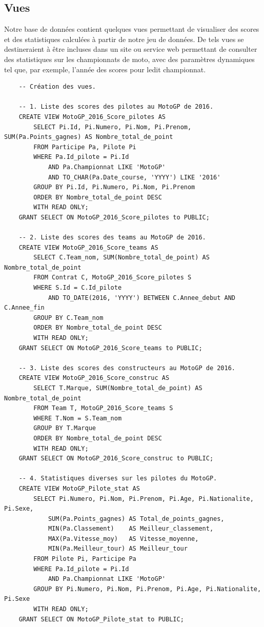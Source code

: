 \documentclass[12pt,a4paper]{article}
\newenvironment{code}{\captionsetup{type=listing}}{}
\begin{document}
\subsection{Vues}
\label{sub.views}

Notre base de données contient quelques vues permettant de visualiser des scores
et des statistiques calculées à partir de notre jeu de données. De tels vues se
destineraient à être incluses dans un site ou service web permettant de consulter
des statistiques sur les championnats de moto, avec des paramètres dynamiques
tel que, par exemple, l'année des scores pour ledit championnat.

\begin{code}
    \begin{verbatim}
    -- Création des vues.

    -- 1. Liste des scores des pilotes au MotoGP de 2016.
    CREATE VIEW MotoGP_2016_Score_pilotes AS
        SELECT Pi.Id, Pi.Numero, Pi.Nom, Pi.Prenom, SUM(Pa.Points_gagnes) AS Nombre_total_de_point
        FROM Participe Pa, Pilote Pi
        WHERE Pa.Id_pilote = Pi.Id
            AND Pa.Championnat LIKE 'MotoGP'
            AND TO_CHAR(Pa.Date_course, 'YYYY') LIKE '2016'
        GROUP BY Pi.Id, Pi.Numero, Pi.Nom, Pi.Prenom
        ORDER BY Nombre_total_de_point DESC
        WITH READ ONLY;
    GRANT SELECT ON MotoGP_2016_Score_pilotes to PUBLIC;
        
    -- 2. Liste des scores des teams au MotoGP de 2016.
    CREATE VIEW MotoGP_2016_Score_teams AS
        SELECT C.Team_nom, SUM(Nombre_total_de_point) AS Nombre_total_de_point
        FROM Contrat C, MotoGP_2016_Score_pilotes S
        WHERE S.Id = C.Id_pilote
            AND TO_DATE(2016, 'YYYY') BETWEEN C.Annee_debut AND C.Annee_fin
        GROUP BY C.Team_nom
        ORDER BY Nombre_total_de_point DESC
        WITH READ ONLY;
    GRANT SELECT ON MotoGP_2016_Score_teams to PUBLIC;

    -- 3. Liste des scores des constructeurs au MotoGP de 2016.
    CREATE VIEW MotoGP_2016_Score_construc AS
        SELECT T.Marque, SUM(Nombre_total_de_point) AS Nombre_total_de_point
        FROM Team T, MotoGP_2016_Score_teams S
        WHERE T.Nom = S.Team_nom
        GROUP BY T.Marque
        ORDER BY Nombre_total_de_point DESC
        WITH READ ONLY;
    GRANT SELECT ON MotoGP_2016_Score_construc to PUBLIC;

    -- 4. Statistiques diverses sur les pilotes du MotoGP.
    CREATE VIEW MotoGP_Pilote_stat AS
        SELECT Pi.Numero, Pi.Nom, Pi.Prenom, Pi.Age, Pi.Nationalite, Pi.Sexe,
            SUM(Pa.Points_gagnes) AS Total_de_points_gagnes,
            MIN(Pa.Classement)    AS Meilleur_classement,
            MAX(Pa.Vitesse_moy)   AS Vitesse_moyenne,
            MIN(Pa.Meilleur_tour) AS Meilleur_tour
        FROM Pilote Pi, Participe Pa
        WHERE Pa.Id_pilote = Pi.Id
            AND Pa.Championnat LIKE 'MotoGP'
        GROUP BY Pi.Numero, Pi.Nom, Pi.Prenom, Pi.Age, Pi.Nationalite, Pi.Sexe
        WITH READ ONLY;
    GRANT SELECT ON MotoGP_Pilote_stat to PUBLIC;


\end{verbatim}
\end{code}
\end{document}
